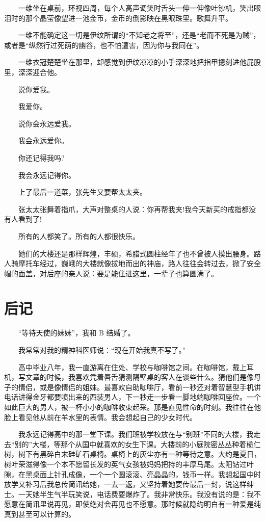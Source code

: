 \documentclass[12pt,UTF8]{ctexbook}
\begin{document}
　　一维坐在桌前，环视四周，每个人高声调笑时舌头一伸一伸像吐钞机，笑出眼泪时的那个晶莹像望进一池金币，金币的倒影映在黑眼珠里。歌舞升平。

　　一维不能确定这一切是伊纹所谓的\enquote{不知老之将至}，还是\enquote{老而不死是为贼}，或者是\enquote{纵然行过死荫的幽谷，也不怕遭害，因为你与我同在}。

　　一维衣冠楚楚坐在那里，却感觉到伊纹凉凉的小手深深地把指甲摁刻进他屁股里，深深迎合他。

　　说你爱我。

　　我爱你。

　　说你会永远爱我。

　　我会永远爱你。

　　你还记得我吗?

　　我会永远记得你。

　　上了最后一道菜，张先生又要帮太太夹。

　　张太太张舞着指爪，大声对整桌的人说：你再帮我夹!我今天新买的戒指都没有人看到了!

　　所有的人都笑了。所有的人都很快乐。

　　她们的大楼还是那样辉煌，丰硕，希腊式圆柱经年了也不曾被人摸出腰身。路人骑摩托车经过，巍峨的大楼就像拔地而出的神庙，路人往往会转过去，掀了安全帽的面盖，对后座的亲人说：要是能住进这里，一辈子也算圆满了。

\hypertarget{houji}{%
\chapter*{后记}\label{houji}}

　　\enquote{等待天使的妹妹}，我和 B 结婚了。

　　我常常对我的精神科医师说：\enquote{现在开始我真不写了。}

　　高中毕业八年，我一直游离在住处、学校与咖啡馆之间。在咖啡馆，戴上耳机，写文章的时候，我喜欢凭着唇舌猜测隔壁桌的客人在谈些什么。猜他们是像母子的情侣，或是像情侣的姐妹。最喜欢自助咖啡厅，看前一秒还对着智慧型手机讲电话讲得金牙都要喷出来的西装男人，下一秒走一步看一脚地端咖啡回座位。一个如此巨大的男人，被一杯小小的咖啡收束起采。那是直见性命的时刻。我往往在他脸上看见他从前在羊水里的表情。我会想起自己的少女时代。

　　我永远记得高中的那一堂下课。我们班被学校放在与\enquote{别班}不同的大楼，我走去\enquote{别的}大楼，等那个从国中就喜欢的女生下课。大楼前的小庭院密丛丛种着榄仁树，树下有黑碎白末硅矿石桌椅。桌椅上的灰尘亦有一种等待之意。大约是夏日，树叶荣滋得像一个本不愿留长发的英气女孩被妈妈把持的丰厚马尾。太阳钻过叶隙，在黑桌面上针孔成像，一个一个圆滚滚、亮晶晶的，钱币一样。我想起国中时放学又补习后我总传简讯给她，一去一返，又坚持着她要传最后一封，说这样绅士。一天她半生气半玩笑说，电话费要爆炸了。我非常快乐。我没有说的是：我不愿意在简讯里说再见，即使绝对会再见也不愿意。那时候就隐约明白有一种爱是纯真到甚至可以计算的。
\end{document}
